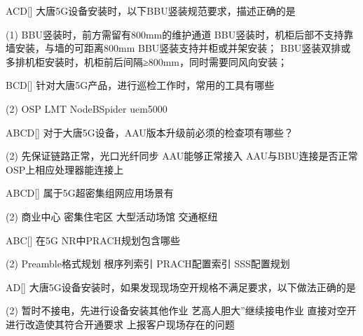\begin{choice}{\;ACD\;}[]
    大唐5G设备安装时，以下BBU竖装规范要求，描述正确的是
    \begin{tasks}(1)
        \task BBU竖装时，前方需留有800mm的维护通道
        \task BBU竖装时，机柜后部不支持靠墙安装，与墙的可距离800mm
        \task BBU竖装支持并柜或并架安装；
        \task BBU竖装双排或多排机柜安装时，机柜前后间隔≥800mm，同时需要同风向安装；
    \end{tasks}
\end{choice}


\begin{choice}{\;BCD\;}[]
    针对大唐5G产品，进行巡检工作时，常用的工具有哪些

    \begin{tasks}(2)
        \task OSP
        \task LMT
        \task NodeBSpider
        \task uem5000
    \end{tasks}
\end{choice}


\begin{choice}{\;ABCD\;}[]
    对于大唐5G设备，AAU版本升级前必须的检查项有哪些？
    \begin{tasks}(2)
        \task 先保证链路正常，光口光纤同步
        \task AAU能够正常接入
        \task AAU与BBU连接是否正常
        \task OSP上相应处理器能连接上
    \end{tasks}
\end{choice}


\begin{choice}{\;ABCD\;}[]
    属于5G超密集组网应用场景有
    \begin{tasks}(2)
        \task 商业中心
        \task 密集住宅区
        \task 大型活动场馆
        \task 交通枢纽
    \end{tasks}
\end{choice}


\begin{choice}{\;ABC\;}[]
    在5G NR中PRACH规划包含哪些
    \begin{tasks}(2)
        \task Preamble格式规划
        \task 根序列索引
        \task PRACH配置索引
        \task SSS配置规划
    \end{tasks}
\end{choice}


\begin{choice}{\;AD\;}[]
    大唐5G设备安装时，如果发现现场空开规格不满足要求，以下做法正确的是
    \begin{tasks}(2)
        \task 暂时不接电，先进行设备安装其他作业
        \task 艺高人胆大”继续接电作业
        \task 直接对空开进行改造使其符合开通要求
        \task 上报客户现场存在的问题
    \end{tasks}
\end{choice}



